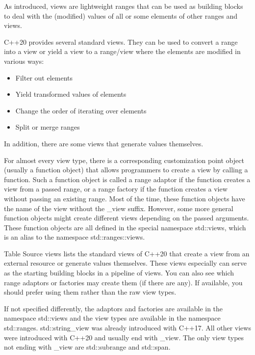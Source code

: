 
As introduced, views are lightweight ranges that can be used as building blocks to deal with the (modified) values of all or some elements of other ranges and views.

C++20 provides several standard views. They can be used to convert a range into a view or yield a view to a range/view where the elements are modified in various ways:

\begin{itemize}
\item
Filter out elements

\item
Yield transformed values of elements

\item
Change the order of iterating over elements

\item
Split or merge ranges
\end{itemize}

In addition, there are some views that generate values themselves.

For almost every view type, there is a corresponding customization point object (usually a function object) that allows programmers to create a view by calling a function. Such a function object is called a range adaptor if the function creates a view from a passed range, or a range factory if the function creates a view without passing an existing range. Most of the time, these function objects have the name of the view without the \_view suffix. However, some more general function objects might create different views depending on the passed arguments. These function objects are all defined in the special namespace std::views, which is an alias to the namespace std::ranges::views.

Table Source views lists the standard views of C++20 that create a view from an external resource or generate values themselves. These views especially can serve as the starting building blocks in a pipeline of views. You can also see which range adaptors or factories may create them (if there are any). If available, you should prefer using them rather than the raw view types.

If not specified differently, the adaptors and factories are available in the namespace std::views and the view types are available in the namespace std::ranges. std::string\_view was already introduced with C++17. All other views were introduced with C++20 and usually end with \_view. The only view types not ending with \_view are std::subrange and std::span.

